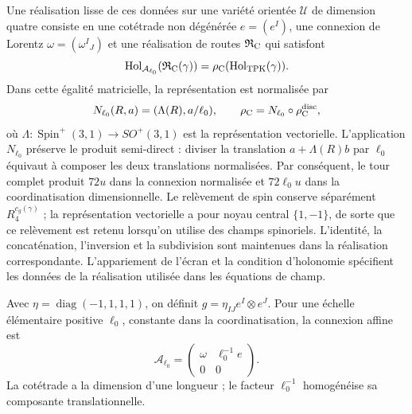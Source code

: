 Une réalisation lisse de ces données sur une variété orientée \(\mathcal U\) de dimension quatre consiste en une cotétrade non dégénérée \(e=(e^I)\), une connexion de Lorentz \(\omega=(\omega^I{}_J)\) et une réalisation de routes \(\mathfrak R_{\rm C}\) qui satisfont
\begin{equation}
 \operatorname{Hol}_{\mathcal A_{\ell_0}}
       (\mathfrak R_{\rm C}(\gamma))
 =\rho_{\rm C}(\operatorname{Hol}_{\rm TPK}(\gamma)).
 \label{vii:eq:compatibilidad-holonomia-geometrica}
\end{equation}
Dans cette égalité matricielle, la représentation est normalisée par
\[
 N_{\ell_0}(R,a)=(\Lambda(R),a/\ell_0),\qquad
 \rho_{\rm C}=N_{\ell_0}\circ\rho_{\rm C}^{\rm disc},
\]
où \(\Lambda:\operatorname{Spin}^+(3,1)\to SO^+(3,1)\)
est la représentation vectorielle. L’application \(N_{\ell_0}\)
préserve le produit semi-direct : diviser la translation
\(a+\Lambda(R)b\) par \(\ell_0\) équivaut à composer les
deux translations normalisées. Par conséquent, le tour complet produit
\(72u\) dans la connexion normalisée et \(72\ell_0u\) dans la
coordinatisation dimensionnelle. Le relèvement de spin conserve séparément
\(R_4^{c_g(\gamma)}\) ; la représentation vectorielle a pour
noyau central \(\{1,-1\}\), de sorte que ce
relèvement est retenu lorsqu’on utilise des champs spinoriels.
L’identité, la concaténation, l’inversion et la subdivision sont maintenues dans la
réalisation correspondante. L’appariement de
l’écran et la condition d’holonomie spécifient les données de la
réalisation utilisée dans les équations de champ.

Avec \(\eta=\operatorname{diag}(-1,1,1,1)\), on définit
\(g=\eta_{IJ}e^I\otimes e^J\). Pour une échelle élémentaire
positive \(\ell_0\), constante dans la coordinatisation, la connexion affine est
\begin{equation}
 \mathcal A_{\ell_0}
 =\begin{pmatrix}\omega&\ell_0^{-1}e\\0&0\end{pmatrix}.
 \label{vii:eq:conexion-afin-realizada}
\end{equation}
La cotétrade a la dimension d'une longueur ; le facteur \(\ell_0^{-1}\) homogénéise sa composante translationnelle.

